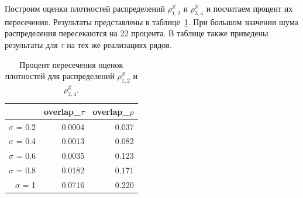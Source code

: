 \documentclass[specialist,
               substylefile = spbu.rtx,
               subf,href,colorlinks=true, 12pt]{disser}
\begin{document}
Построим оценки плотностей распределений $\rho^{\mathbb{X}}_{1,2}$  и  $\rho^{\mathbb{X}}_{3,4}$  и посчитаем процент их пересечения. Результаты представлены в таблице~\ref{tab:model_dist_pgram_overlap22}. При большом значении шума распределения пересекаются на 22 процента.
В таблице также приведены результаты для $\tau$ на тех же реализациях рядов.

\begin{table}[hhh!]
\caption{Процент пересечения оценок плотностей для распределений $\rho^{\mathbb{X}}_{1,2}$  и $\rho^{\mathbb{X}}_{3,4}$.}
\centering
\begin{tabular}{rrr}
  \hline
& overlap\_$\tau$& overlap\_$\rho$ \\
  \hline
$\sigma$ = 0.2 & 0.0004 & 0.037 \\
  $\sigma$ = 0.4 & 0.0013 & 0.082 \\
  $\sigma$ = 0.6 & 0.0035 & 0.123 \\
  $\sigma$ = 0.8 & 0.0182 & 0.171 \\
  $\sigma$ = 1 & 0.0716 & 0.220 \\
   \hline
\end{tabular}
\label{tab:model_dist_pgram_overlap22}
\end{table}
%
%
%
%
%
\end{document}
